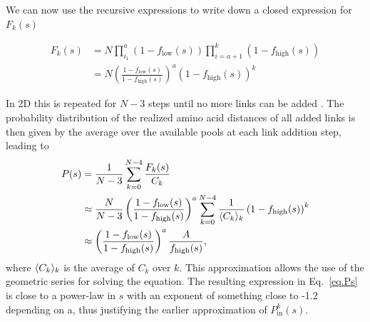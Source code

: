 \documentclass[
reprint,
twocolumn,
amsmath,amssymb,superscriptaddress,aps,
pre]{revtex4-1}
\newcommand{\red}[1]{\textcolor{red!80!black}{#1}}
\DeclarePairedDelimiter{\evdel}{\langle}{\rangle}
\newcommand{\Pin}{P_{\mathrm{in}}}
\newcommand{\fhigh}{f_{\mathrm{high}}}
\newcommand{\flow}{f_{\mathrm{low}}}
\begin{document}
We can now use the recursive expressions to write down a closed expression for $F_k(s)$

\begin{align}
    F_k(s)&=N\prod_{i_1}^a\left(1-\flow(s)\right)\prod_{i=a+1}^k\left(1-\fhigh(s)\right) \nonumber \\
    &= N\left(\frac{1-\flow(s)}{1-\fhigh(s)}\right)^a\left(1-\fhigh(s)\right)^{k}
\end{align}

In 2D this is repeated for $N-3$ steps until no more links can be added \cite{molkenthin2016scaling}.
The probability distribution of the realized amino acid distances of all added links is then given by the average over the available pools at each link addition step, leading to
\begin{align}
    P(s)&=\frac{1}{N-3}\sum_{k=0}^{N-4} \frac{F_k(s)}{C_k} \nonumber \\
    &\approx \frac{N}{N-3}\left(\frac{1-\flow(s)}{1-\fhigh(s)}\right)^a
\sum_{k=0}^{N-4} \frac{1}{\evdel{C_k}_k} \left(1-\fhigh(s)\right)^{k} \nonumber \\
    &\approx \left(\frac{1-\flow(s)}{1-\fhigh(s)}\right)^a\frac{A}{\fhigh(s)},
    \label{eq.Ps}
\end{align}
where $\evdel{C_k}_k$ is the average of $C_k$ over $k$.
This approximation allows the use of the geometric series for solving the equation. 
The resulting expression in Eq.~\ref{eq.Ps} is close to a power-law in $s$ with an exponent of \red{something close to -1.2 depending on a}, thus justifying the earlier approximation of $\Pin^k(s)$.
\end{document}
